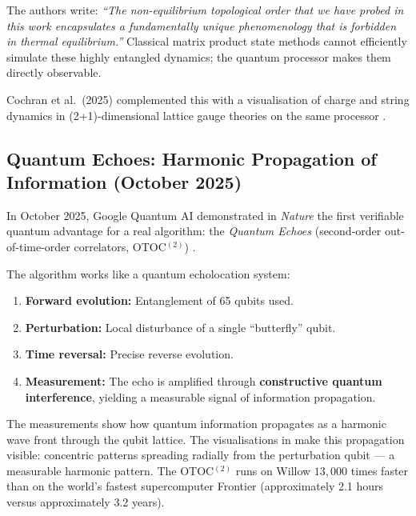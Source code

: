 The authors write: \textit{``The non-equilibrium topological order that we have
probed in this work encapsulates a fundamentally unique phenomenology that is
forbidden in thermal equilibrium.''} \cite{Will2025Nature}
Classical matrix product state methods cannot efficiently simulate these
highly entangled dynamics; the quantum processor makes them directly observable.

Cochran et al.\ (2025) complemented this with a visualisation of charge and string
dynamics in (2+1)-dimensional lattice gauge theories on the same processor
\cite{Cochran2025Nature}.

\subsection{Quantum Echoes: Harmonic Propagation of Information (October 2025)}

In October 2025, Google Quantum AI demonstrated in \textit{Nature} the first
verifiable quantum advantage for a real algorithm: the \emph{Quantum Echoes}
(second-order out-of-time-order correlators, OTOC$^{(2)}$) \cite{GoogleEchoes2025}.

The algorithm works like a quantum echolocation system:
\begin{enumerate}
    \item \textbf{Forward evolution:} Entanglement of 65 qubits used.
    \item \textbf{Perturbation:} Local disturbance of a single ``butterfly'' qubit.
    \item \textbf{Time reversal:} Precise reverse evolution.
    \item \textbf{Measurement:} The echo is amplified through \textbf{constructive
    quantum interference}, yielding a measurable signal of information propagation.
\end{enumerate}

\begin{keypoint}
The measurements show how quantum information propagates as a harmonic wave front
through the qubit lattice. The visualisations in \cite{GoogleEchoes2025} make this
propagation visible: concentric patterns spreading radially from the perturbation
qubit — a measurable harmonic pattern.
The OTOC$^{(2)}$ runs on Willow $13{,}000$ times faster than on the world's fastest
supercomputer Frontier (approximately 2.1 hours versus approximately 3.2 years).
\end{keypoint}

